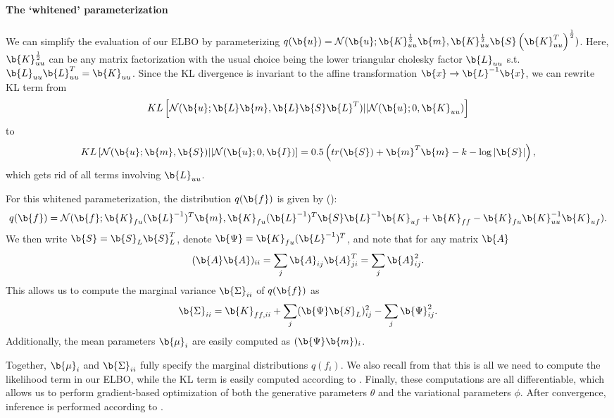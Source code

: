 \paragraph{The `whitened' parameterization}

We can simplify the evaluation of our ELBO by parameterizing $q(\b{u}) = \mathcal{N}(\b{u}; \b{K}_{uu}^{\frac12} \b{m}, \b{K}_{uu}^{\frac12} \b{S} \left ( \b{K}_{uu}^T \right )^{\frac12})$.
Here, $\b{K}_{uu}^{\frac12}$ can be any matrix factorization with the usual choice being the lower triangular cholesky factor $\b{L}_{uu}$ s.t. $\b{L}_{uu} \b{L}_{uu}^T = \b{K}_{uu}$.
Since the KL divergence is invariant to the affine transformation $\b{x} \rightarrow \b{L}^{-1} \b{x}$, we can rewrite KL term from
\begin{equation}
    KL \left [ \mathcal{N}(\b{u}; \b{L} \b{m}, \b{L} \b{S} \b{L}^T) || \mathcal{N}(\b{u}; 0, \b{K}_{uu}) \right ]
\end{equation}
to
\begin{equation}
    \label{eq:KL_white}
    KL \left [ \mathcal{N}(\b{u}; \b{m}, \b{S}) || \mathcal{N}(\b{u}; 0, \b{I}) \right ] = 0.5 \left ( tr(\b{S})
    + \b{m}^T \b{m} - k - \log |\b{S}|
     \right ),
\end{equation}
which gets rid of all terms involving $\b{L}_{uu}$.

For this whitened parameterization, the distribution $q(\b{f})$ is given by ():
\begin{equation}
    q(\b{f}) = \mathcal{N} ( \b{f}; \b{K}_{fu} (\b{L}^{-1})^T \b{m},
    \b{K}_{fu} (\b{L}^{-1})^T \b{S} \b{L}^{-1} \b{K}_{uf} + \b{K}_{ff} - \b{K}_{fu} \b{K}_{uu}^{-1} \b{K}_{uf} ).
\end{equation}
We then write $\b{S} = \b{S}_L \b{S}_L^T$, denote $\b{\Psi} = \b{K}_{fu} (\b{L}^{-1})^T$, and note that for any matrix $\b{A}$
\begin{equation}
    (\b{A} \b{A})_{ii} = \sum_j \b{A}_{ij} \b{A}^T_{ji} = \sum_j \b{A}_{ij}^2.
\end{equation}
This allows us to compute the marginal variance $\b{\Sigma}_{ii}$ of $q(\b{f})$ as
\begin{equation}
    \label{eq:white_marginals}
    \b{\Sigma}_{ii} = \b{K}_{ff, ii} + \sum_j (\b{\Psi} \b{S}_L)_{ij}^2 - \sum_{j} \b{\Psi}_{ij}^2.
\end{equation}
Additionally, the mean parameters $\b{\mu}_i$ are easily computed as $(\b{\Psi} \b{m})_i$.

Together, $\b{\mu}_i$ and $\b{\Sigma}_{ii}$ fully specify the marginal distributions $q(f_i)$.
We also recall from  that this is all we need to compute the likelihood term in our ELBO, while the KL term is easily computed according to .
Finally, these computations are all differentiable, which allows us to perform gradient-based optimization of both the generative parameters $\theta$ and the variational parameters $\phi$.
After convergence, inference is performed according to .